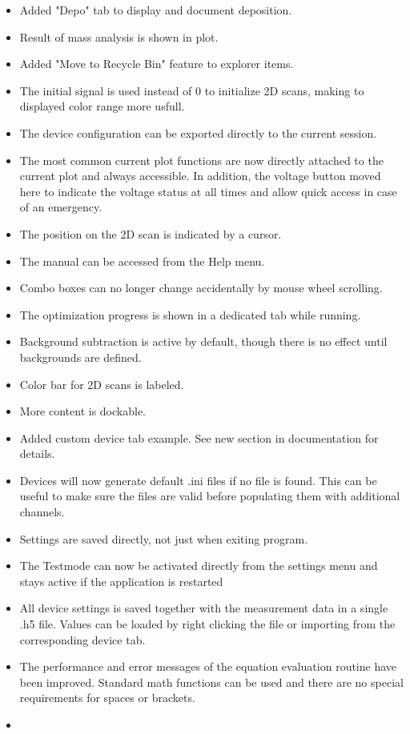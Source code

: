 \documentclass[a4paper,11pt,DIV=13]{scrartcl}
\begin{document}
\begin{itemize}
\item Added "Depo" tab to display and document deposition.
\item Result of mass analysis is shown in plot.
\item Added "Move to Recycle Bin" feature to explorer items.
\item The initial signal is used instead of 0 to initialize 2D scans, making to displayed color range more usfull.
\item The device configuration can be exported directly to the current session.
\item The most common current plot functions are now directly attached to the current plot and always accessible. In addition, the voltage button moved here to indicate the voltage status at all times and allow quick access in case of an emergency.
\item The position on the 2D scan is indicated by a cursor.
\item The manual can be accessed from the Help menu.
\item Combo boxes can no longer change accidentally by mouse wheel scrolling.
\item The optimization progress is shown in a dedicated tab while running.
\item Background subtraction is active by default, though there is no effect until backgrounds are defined.
\item Color bar for 2D scans is labeled.
\item More content is dockable.
\item Added custom device tab example. See new section in documentation for details.
\item Devices will now generate default .ini files if no file is found. This can be useful to make sure the files are valid before populating them with additional channels.
\item Settings are saved directly, not just when exiting program.
\item The Testmode can now be activated directly from the settings menu and stays active if the application is restarted
\item All device settings is saved together with the measurement data in a single .h5 file. Values can be loaded by right clicking the file or importing from the corresponding device tab.
\item The performance and error messages of the equation evaluation routine have been improved. Standard math functions can be used and there are no special requirements for spaces or brackets.
\item 
\end{itemize}
\end{document}
